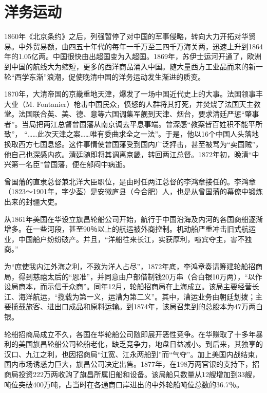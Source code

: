 \documentclass[10pt,a4paper]{beamer} %
\begin{document}
	\section{洋务运动}
	\begin{frame}
		1860年《北京条约》之后，列强暂停了对中国的军事侵略，转向大力开拓对华贸易。中外贸易额，由四五十年代的每年一千万至三四千万海关两，迅速上升到1864年的1.05亿两。中国很快由出超国变为入超国。1869年，苏伊士运河开通了，欧洲到中国的航线大为缩短，更多的西洋商品涌入中国。随大量西方工业品而来的新一轮“西学东渐”浪潮，促使晚清中国的洋务运动发生渐进的质变。　　　
		
		1870年，大清帝国的京畿重地天津，爆发了一场中国近代史上的大事。法国领事丰大业（M. Fontanier）枪击中国民众，愤怒的人群将其打死，并焚烧了法国天主教堂。法国联合英、美、德、意等六国调集军舰到天津、烟台，要求清廷严惩“肇事者”。当局把两江总督曾国藩从南京调去平息事端。曾深感“教案皆百姓积不能平所致”， “……此次天津之案……唯有委曲求全之一法”。于是，他以16个中国人头落地换取西方七国息怒。这件事情使曾国藩受到国内广泛抨击，甚至被骂为“卖国贼”，他自己也深感内疚。清廷随即将其调离京畿，转回两江总督。1872年初，晚清“中兴第一名臣”曾国藩，便在郁闷中病逝。
		
		曾国藩的直隶总督兼北洋大臣职位，是由时任两江总督的李鸿章接任的。李鸿章（1823～1901年，字少荃）是安徽庐县（今合肥）人，也是从曾国藩的幕僚中锻炼出来的封疆大吏。
		
		从1861年美国在华设立旗昌轮船公司开始，航行于中国沿海及内河的各国商船逐渐增多。在一些河段，甚至90％以上的航运被外商控制。机动船严重冲击旧式航运业，中国船户纷纷破产。并且，“洋船往来长江，实获厚利，喧宾夺主，害不独商。”
		
		为“庶使我内江外海之利，不致为洋人占尽”，1872年底，李鸿章奏请筹建轮船招商局，得到慈禧太后的“恩准”，并同意由户部借制钱20万串（合白银10万两），“以作设局商本，而示信于众商”。同年12月，轮船招商局在上海成立。该局主要经营长江、海洋航运，“揽载为第一义，运漕为第二义”。其中，漕运业务由朝廷划拨；主要揽载旅客、进出口成品和原料运输。到1874年，该局召集到的总股本为47万两白银。
		
		轮船招商局成立不久，各国在华轮船公司随即展开恶性竞争。在华赚取了十多年暴利的美国旗昌轮船公司轮船老化，缺乏竞争力，地盘日益减小。到后来，其独享的汉口、九江之利，也因招商局“江宽、江永两船到”而“气夺”。加上美国内战结束，国内市场诱惑力巨大，旗昌公司决定出售。1877年，在198万两官银的支持下，招商局投资222万两收购了旗昌所属旧船和设备。该局船只数量从12艘增加到33艘，吨位突破400万吨，占当时在各通商口岸进出的中外轮船吨位总数的36.7％。
	\end{frame}
\end{document}
